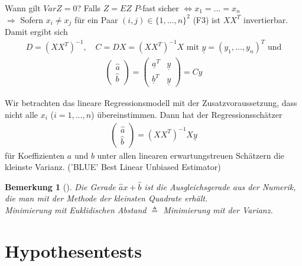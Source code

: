 \documentclass[a4paper,openany]{book}
\theoremstyle{mytheoremstyle}
\newtheorem*{bem}{Bemerkung}
\theoremstyle{mytheoremstyle2}
\begin{document}
Wann gilt $VarZ=0$? Falls $Z=EZ$ $P$-fast sicher  $\Leftrightarrow x_1=...=x_n$ \\
$\Rightarrow $ Sofern $x_i \neq x_j$ für ein Paar $(i,j)\in \{1,...,n\}^2$ (F3) ist $XX^T$ invertierbar. \\
Damit ergibt sich 
\begin{align*}
  D=(XX^T)^{-1},\quad C=DX=(XX^T)^{-1}X \text{ mit }\underline{y}=(y_1,...,y_n)^T \text{ und}
\end{align*}
\begin{align*}
  \begin{pmatrix}\hat{a}\\\hat{b }\end{pmatrix}=\begin{pmatrix}
  \underline{a}^T&\underline{y}\\\underline{b}^T&\underline{y}
  \end{pmatrix}=Cy
\end{align*}
\begin{theo}{}{}
  Wir betrachten das lineare Regressionsmodell mit der Zusatzvoraussetzung, dass nicht alle $x_i$ ($i=1,...,n$) übereinstimmen. Dann hat der Regressionsschätzer
  \begin{align*}
    \begin{pmatrix}\hat{a}\\\hat{b}\end{pmatrix}=(XX^T)^{-1}X \underline{y}
  \end{align*}
  für Koeffizienten $a$ und $b$ unter allen linearen erwartungstreuen Schätzern die kleinste Varianz. ('BLUE' Best Linear Unbiased Estimator)  
\end{theo}
\begin{bem}[]
  Die Gerade $\hat{a}x+\hat{b}$ ist die Ausgleichsgerade aus der Numerik, die man mit der Methode der kleinsten Quadrate erhält. \\
Minimierung mit Euklidischen Abstand $\triangleq$ Minimierung mit der Varianz.
\end{bem}
\chapter{Hypothesentests}
\end{document}
